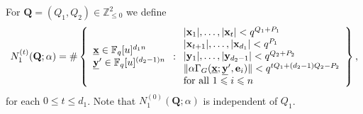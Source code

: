 \documentclass[12pt, reqno]{amsart}
\numberwithin{equation}{section}
\newcommand{\0}{\mathbf{0}}
\newcommand{\FF}{\mathbb{F}}
\newcommand{\ZZ}{\mathbb{Z}}
\renewcommand{\leq}{\leqslant}
\newcommand{\x}{\mathbf{x}}
\newcommand{\y}{\mathbf{y}}
\renewcommand{\=}{\equiv}
\newcommand{\1}{\mathbf{1}}
\theoremstyle{definition}
\begin{document}
For  $\mathbf{Q}=(Q_1, Q_2) \in \ZZ_{\leq 0}^2$ we define
$$
N_1^{(t)}(\mathbf Q; \alpha)
=
\# \left\{
\begin{array}{l}
\underline{\x}\in \FF_q[u]^{d_1 n}\\
\underline{\mathbf{y}}'
 \in \FF_q[u]^{(d_2-1)n}
\end{array}
 :
\begin{array}{l}
 |\x_1|,\ldots, |\x_t| < q^{  Q_1 + P_1 } \\
 |\x_{t + 1}|,\ldots, |\x_{d_1} | < q^{P_1} \\
 |\y_1|, \ldots, |\y_{d_2-1}| < q^{Q_2 + P_2 }  \\
 \| \alpha \Gamma_G(  \underline{\x} ; \underline{\mathbf{y}}',  \mathbf{e}_{i} ) \| < q^{ t Q_1 + (d_2 - 1) Q_2 -  P_2 } \\
 \textnormal{for all $1 \leq i \leq n$}
\end{array}
\right\},
$$
for each $0 \leq t \leq d_1$. Note that $N_1^{(0)}(\mathbf Q; \alpha)$ is independent of $Q_1$.
\end{document}
